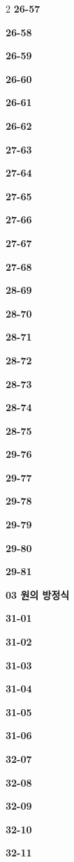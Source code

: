 \documentclass[10pt,a4paper]{article}
\begin{document}
\begin{multicols}{2}
\noindent\textbf{26-57}\ \par
\noindent\textbf{26-58}\ \par
\noindent\textbf{26-59}\ \par
\noindent\textbf{26-60}\ \par
\noindent\textbf{26-61}\ \par
\noindent\textbf{26-62}\ \par
\noindent\textbf{27-63}\ \par
\noindent\textbf{27-64}\ \par
\noindent\textbf{27-65}\ \par
\noindent\textbf{27-66}\ \par
\noindent\textbf{27-67}\ \par
\noindent\textbf{27-68}\ \par
\noindent\textbf{28-69}\ \par
\noindent\textbf{28-70}\ \par
\noindent\textbf{28-71}\ \par
\noindent\textbf{28-72}\ \par
\noindent\textbf{28-73}\ \par
\noindent\textbf{28-74}\ \par
\noindent\textbf{28-75}\ \par
\noindent\textbf{29-76}\ \par
\noindent\textbf{29-77}\ \par
\noindent\textbf{29-78}\ \par
\noindent\textbf{29-79}\ \par
\noindent\textbf{29-80}\ \par
\noindent\textbf{29-81}\ \par
\noindent\textbf{03 원의 방정식}\par\smallskip
\noindent\textbf{31-01}\ \par
\noindent\textbf{31-02}\ \par
\noindent\textbf{31-03}\ \par
\noindent\textbf{31-04}\ \par
\noindent\textbf{31-05}\ \par
\noindent\textbf{31-06}\ \par
\noindent\textbf{32-07}\ \par
\noindent\textbf{32-08}\ \par
\noindent\textbf{32-09}\ \par
\noindent\textbf{32-10}\ \par
\noindent\textbf{32-11}\ \par

\end{multicols}
\end{document}
